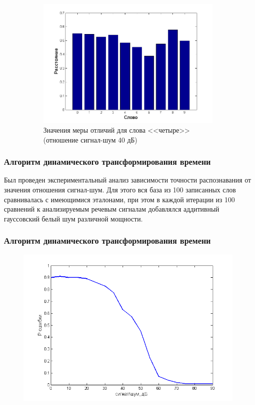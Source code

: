 \documentclass[slidestop, compress, mathserif, blackandwhite, utf8, serif, slidescentered]{beamer}
\begin{document}
\begin{frame}[plain]
\begin{figure}[h]
\begin{subfigure}{0.32\textwidth}
			\centering
			\includegraphics[width=\textwidth]{../40db_4.png}			
			\caption{Значения меры отличий для слова <<четыре>> (отношение сигнал-шум 40 дБ)}
			\label{40db_4}
		\end{subfigure}
		\caption{}
	\end{figure}
\end{frame}

\begin{frame}[plain]
	\frametitle{Алгоритм динамического трансформирования времени}
	Был проведен экспериментальный анализ зависимости точности распознавания от значения отношения сигнал-шум. Для этого вся база из 100 записанных слов сравнивалась с имеющимися эталонами, при этом в каждой итерации из 100 сравнений к анализируемым речевым сигналам добавлялся аддитивный гауссовский белый шум различной мощности.
\end{frame}

\begin{frame}[plain]
	\frametitle{Алгоритм динамического трансформирования времени}
	\begin{figure}[H]	
		\centering
		\includegraphics[width=.7\textwidth]{../snr-err.png}			
		\caption{}
		\label{snr-err}
	\end{figure}
\end{frame}
\end{document}

